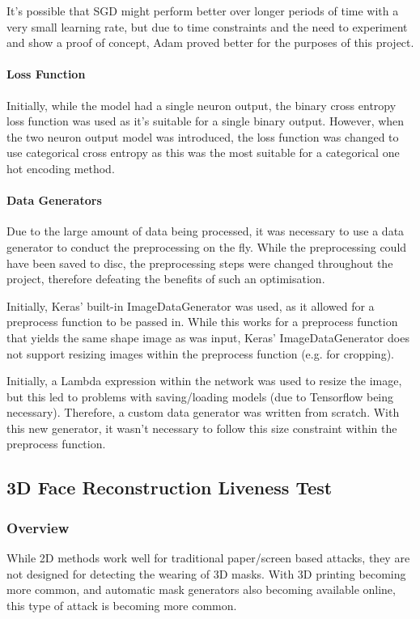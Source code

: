 \documentclass[11pt,a4paper]{article}
\begin{document}
                It's possible that SGD might perform better over longer periods of time with a very small learning rate, but due to time constraints and the need to experiment and show a proof of concept,
                Adam proved better for the purposes of this project.


                \paragraph{Loss Function}
                    Initially, while the model had a single neuron output, the binary cross entropy loss function was used as it's suitable for a single binary output.
                    However, when the two neuron output model was introduced, the loss function was changed to use categorical cross entropy as this was the most suitable
                    for a categorical one hot encoding method.

                \paragraph{Data Generators}
                    Due to the large amount of data being processed, it was necessary to use a data generator to conduct the preprocessing on the fly. While the preprocessing
                    could have been saved to disc, the preprocessing steps were changed throughout the project, therefore defeating the benefits of such an optimisation.

                    Initially, Keras' built-in ImageDataGenerator was used, as it allowed for a preprocess function to be passed in. While this works for a preprocess function that yields the same shape image
                    as was input, Keras' ImageDataGenerator does not support resizing images within the preprocess function (e.g. for cropping).

                    Initially, a Lambda expression within the network was used to resize the image, but this led to problems with saving/loading models (due to Tensorflow being necessary).
                    Therefore, a custom data generator was written from scratch. With this new generator, it wasn't necessary to follow this size constraint within the preprocess function.


    \subsection{3D Face Reconstruction Liveness Test}
        \subsubsection{Overview}
            While 2D methods work well for traditional paper/screen based attacks, they are not designed for detecting the wearing of 3D masks. With 3D printing
            becoming more common, and automatic mask generators also becoming available online, this type of attack is becoming more common.
\end{document}
